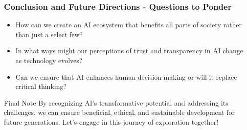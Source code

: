\documentclass[aspectratio=169]{beamer}
\begin{document}
\begin{frame}[fragile]
    \frametitle{Conclusion and Future Directions - Questions to Ponder}
    \begin{itemize}
        \item How can we create an AI ecosystem that benefits all parts of society rather than just a select few?
        \item In what ways might our perceptions of trust and transparency in AI change as technology evolves?
        \item Can we ensure that AI enhances human decision-making or will it replace critical thinking?
    \end{itemize}

    \begin{block}{Final Note}
        By recognizing AI's transformative potential and addressing its challenges, we can ensure beneficial, ethical, and sustainable development for future generations. Let's engage in this journey of exploration together!
    \end{block}
\end{frame}
\end{document}
